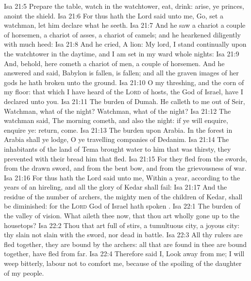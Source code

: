 \vs Isa 21:5 Prepare the table, watch in the watchtower, eat, drink: arise, ye princes,  anoint the shield.
\vs Isa 21:6 For thus hath the Lord said unto me, Go, set a watchman, let him declare what he seeth.
\vs Isa 21:7 And he saw a chariot  a couple of horsemen, a chariot of asses,  a chariot of camels; and he hearkened diligently with much heed:
\vs Isa 21:8 And he cried, A lion: My lord, I stand continually upon the watchtower in the daytime, and I am set in my ward whole nights:
\vs Isa 21:9 And, behold, here cometh a chariot of men,  a couple of horsemen. And he answered and said, Babylon is fallen, is fallen; and all the graven images of her gods he hath broken unto the ground.
\vs Isa 21:10 O my threshing, and the corn of my floor: that which I have heard of the \textsc{Lord} of hosts, the God of Israel, have I declared unto you.
\vs Isa 21:11 The burden of Dumah. He calleth to me out of Seir, Watchman, what of the night? Watchman, what of the night?
\vs Isa 21:12 The watchman said, The morning cometh, and also the night: if ye will enquire, enquire ye: return, come.
\vs Isa 21:13 The burden upon Arabia. In the forest in Arabia shall ye lodge, O ye travelling companies of Dedanim.
\vs Isa 21:14 The inhabitants of the land of Tema brought water to him that was thirsty, they prevented with their bread him that fled.
\vs Isa 21:15 For they fled from the swords, from the drawn sword, and from the bent bow, and from the grievousness of war.
\vs Isa 21:16 For thus hath the Lord said unto me, Within a year, according to the years of an hireling, and all the glory of Kedar shall fail:
\vs Isa 21:17 And the residue of the number of archers, the mighty men of the children of Kedar, shall be diminished: for the \textsc{Lord} God of Israel hath spoken .
\vs Isa 22:1 The burden of the valley of vision. What aileth thee now, that thou art wholly gone up to the housetops?
\vs Isa 22:2 Thou that art full of stirs, a tumultuous city, a joyous city: thy slain  not slain with the sword, nor dead in battle.
\vs Isa 22:3 All thy rulers are fled together, they are bound by the archers: all that are found in thee are bound together,  have fled from far.
\vs Isa 22:4 Therefore said I, Look away from me; I will weep bitterly, labour not to comfort me, because of the spoiling of the daughter of my people.
